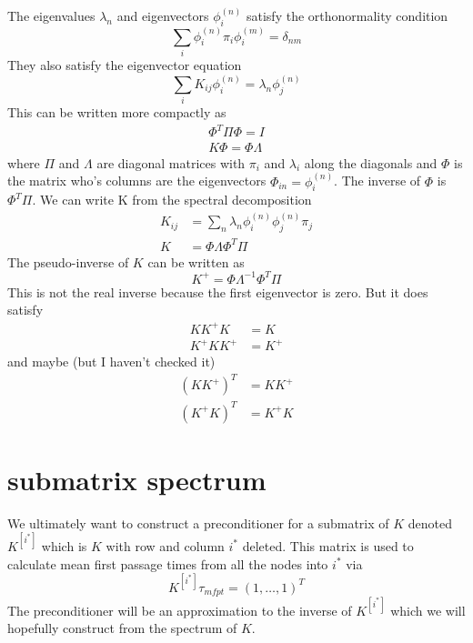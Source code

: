 \documentclass[a4paper]{article}
\newcommand{\evec}[2]{\phi^{(#2)}_{#1}}
\newcommand{\subK}{K^{[i^{*}]}}
\begin{document}
The eigenvalues $\lambda_n$ and eigenvectors $\phi^{(n)}_i$ satisfy the orthonormality condition
\begin{equation}
\sum_i \phi^{(n)}_i \pi_i \phi^{(m)}_i = \delta_{nm}
\end{equation}
They also satisfy the eigenvector equation
\begin{equation}
\sum_i K_{ij} \evec{i}{n}  = \lambda_n \evec{j}{n}
\end{equation}
This can be written more compactly as
\begin{align}
\Phi^{T} \Pi \Phi = I \\
K \Phi = \Phi \Lambda
\end{align}
where $\Pi$ and $\Lambda$ are diagonal matrices with $\pi_i$ and $\lambda_i$ along the diagonals
and $\Phi$ is the matrix who's columns are the eigenvectors $\Phi_{in} = \evec{i}{n}$.
The inverse of $\Phi$ is $\Phi^{T} \Pi$.
We can write K from the spectral decomposition
\begin{align}
K_{ij} &= \sum_n \lambda_n \evec{i}{n} \evec{j}{n} \pi_j \\
K &= \Phi \Lambda \Phi^T \Pi
\end{align}
The pseudo-inverse of $K$ can be written as
\begin{equation}
K^{+} = \Phi \Lambda^{-1} \Phi^T \Pi
\end{equation}
This is not the real inverse because the first eigenvector is zero.  But it does satisfy 
\begin{align}
K K^{+} K &= K \\
K^{+} K K^{+} &= K^{+}
\end{align}
and maybe (but I haven't checked it)
\begin{align}
(K K^{+})^T &= K K^{+} \\
(K^{+} K)^T &= K^{+} K
\end{align}

\section{submatrix spectrum}
We ultimately want to construct a preconditioner for a submatrix of $K$ denoted $\subK{}$ which is $K$
with row and column $i^{*}$ deleted.  This matrix is used to calculate mean first passage times from all the nodes
into $i^{*}$ via
\begin{equation}
\subK{} \tau_{mfpt} = (1, \dots, 1)^T
\end{equation}
The preconditioner will be an approximation to the inverse of $\subK{}$ which we will hopefully construct from 
the spectrum of $K$.
\end{document}
